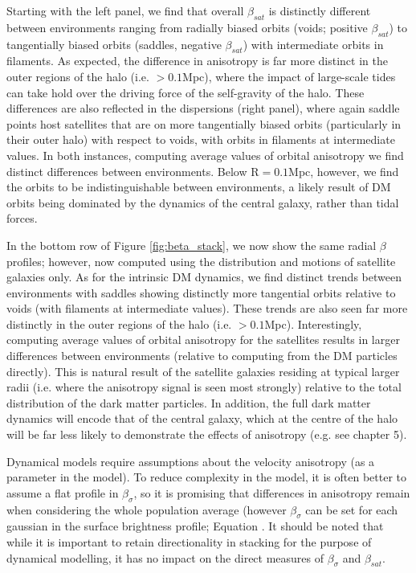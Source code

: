 Starting with the left panel, we find that overall $\beta_{sat}$ is distinctly different between environments ranging from radially biased orbits (voids; positive $\beta_{sat}$) to tangentially biased orbits (saddles, negative $\beta_{sat}$) with intermediate orbits in filaments. As expected, the difference in anisotropy is far more distinct in the outer regions of the halo (i.e. $> 0.1$Mpc), where the impact of large-scale tides can take hold over the driving force of the self-gravity of the halo. These differences are also reflected in the dispersions (right panel), where again saddle points host satellites that are on more tangentially biased orbits (particularly in their outer halo) with respect to voids, with orbits in filaments at intermediate values. In both instances, computing average values of orbital anisotropy we find distinct differences between environments. Below $\mathrm{R = 0.1}$Mpc, however, we find the orbits to be indistinguishable between environments, a likely result of DM orbits being dominated by the dynamics of the central galaxy, rather than tidal forces. 

In the bottom row of Figure \ref{fig:beta_stack}, we now show the same radial $\beta$ profiles; however, now computed using the distribution and motions of satellite galaxies only. As for the intrinsic DM dynamics, we find distinct trends between environments with saddles showing distinctly more tangential orbits relative to voids (with filaments at intermediate values). These trends are also seen far more distinctly in the outer regions of the halo (i.e. $> 0.1$Mpc). Interestingly, computing average values of orbital anisotropy for the satellites results in larger differences between environments (relative to computing from the DM particles directly). This is natural result of the satellite galaxies residing at typical larger radii (i.e. where the anisotropy signal is seen most strongly) relative to the total distribution of the dark matter particles. In addition, the full dark matter dynamics will encode that of the central galaxy, which at the centre of the halo will be far less likely to demonstrate the effects of anisotropy (e.g. see chapter 5). 

Dynamical models require assumptions about the velocity anisotropy (as a parameter in the model). To reduce complexity in the model, it is often better to assume a flat profile in $\beta_{\sigma}$, so it is promising that differences in anisotropy remain when considering the whole population average (however $\beta_{\sigma}$ can be set for each gaussian in the surface brightness profile; Equation . It should be noted that while it is important to retain directionality in stacking for the purpose of dynamical modelling, it has no impact on the direct measures of $\beta_{\sigma}$ and $\beta_{sat}$.

